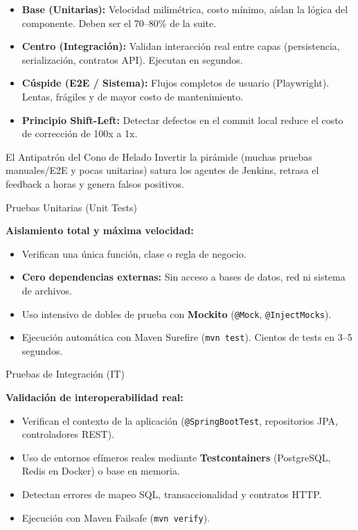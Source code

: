 \documentclass[aspectratio=169]{beamer}
\begin{document}

  {
    {\footnotesize
    \begin{itemize}
      \setlength{\itemsep}{1.5pt}
      \item \textbf{Base (Unitarias):} Velocidad milimétrica, costo mínimo, aíslan la lógica del componente. Deben ser el 70--80\% de la suite.
      \item \textbf{Centro (Integración):} Validan interacción real entre capas (persistencia, serialización, contratos API). Ejecutan en segundos.
      \item \textbf{Cúspide (E2E / Sistema):} Flujos completos de usuario (Playwright). Lentas, frágiles y de mayor costo de mantenimiento.
      \item \textbf{Principio Shift-Left:} Detectar defectos en el commit local reduce el costo de corrección de 100x a 1x.
    \end{itemize}
    }
  }
  {El Antipatrón del Cono de Helado}
  {
    Invertir la pirámide (muchas pruebas manuales/E2E y pocas unitarias) satura los agentes de Jenkins, retrasa el feedback a horas y genera falsos positivos.
  }

  {Pruebas Unitarias (Unit Tests)}
  {
    {\small
    \textbf{Aislamiento total y máxima velocidad:}
    \begin{itemize}
      \setlength{\itemsep}{2pt}
      \item Verifican una única función, clase o regla de negocio.
      \item \textbf{Cero dependencias externas:} Sin acceso a bases de datos, red ni sistema de archivos.
      \item Uso intensivo de dobles de prueba con \textbf{Mockito} (\texttt{@Mock}, \texttt{@InjectMocks}).
      \item Ejecución automática con Maven Surefire (\texttt{mvn test}). Cientos de tests en 3--5 segundos.
    \end{itemize}
    }
  }
  {Pruebas de Integración (IT)}
  {
    {\small
    \textbf{Validación de interoperabilidad real:}
    \begin{itemize}
      \setlength{\itemsep}{2pt}
      \item Verifican el contexto de la aplicación (\texttt{@SpringBootTest}, repositorios JPA, controladores REST).
      \item Uso de entornos efímeros reales mediante \textbf{Testcontainers} (PostgreSQL, Redis en Docker) o base en memoria.
      \item Detectan errores de mapeo SQL, transaccionalidad y contratos HTTP.
      \item Ejecución con Maven Failsafe (\texttt{mvn verify}).
    \end{itemize}
    }
  }
\end{document}
